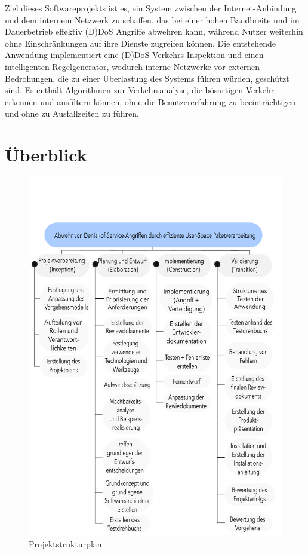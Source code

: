 \documentclass[../review_3.tex]{subfiles}
\begin{document}
Ziel dieses Softwareprojekts ist es, ein System zwischen der Internet-Anbindung und dem internem Netzwerk zu schaffen, das bei einer hohen Bandbreite und im Dauerbetrieb effektiv (D)DoS Angriffe abwehren kann, während Nutzer weiterhin ohne Einschränkungen auf ihre Dienste zugreifen können. Die entstehende Anwendung implementiert eine (D)DoS-Verkehrs-Inspektion und einen intelligenten Regelgenerator, wodurch interne Netzwerke vor externen Bedrohungen, die zu einer Überlastung des Systems führen würden, geschützt sind. Es enthält Algorithmen zur Verkehrsanalyse, die bösartigen Verkehr erkennen und ausfiltern können, ohne die Benutzererfahrung zu beeinträchtigen und ohne zu Ausfallzeiten zu führen.

\section{Überblick}

\begin{figure}[H]
    \centering
    \includegraphics[width=0.8\linewidth]{img/projektstrukturplan.pdf}
    \caption{Projektstrukturplan}
    \label{projektstrukturplan}
\end{figure}
\end{document}
